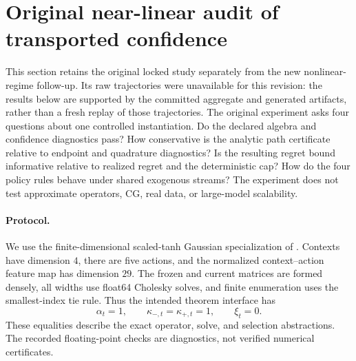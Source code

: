 \section{Original near-linear audit of transported confidence}
\label{sec:transport-instantiation}

This section retains the original locked study separately from the new
nonlinear-regime follow-up.  Its raw trajectories were unavailable for this
revision: the results below are supported by the committed aggregate and
generated artifacts, rather than a fresh replay of those trajectories.
The original experiment asks four questions about one controlled instantiation.  Do the
declared algebra and confidence diagnostics pass?  How conservative is the
analytic path certificate relative to endpoint and quadrature diagnostics?  Is
the resulting regret bound informative relative to realized regret and the
deterministic cap?  How do the four policy rules behave under shared exogenous
streams?  The experiment does not test approximate operators, CG, real data, or
large-model scalability.

\paragraph{Protocol.}
We use the finite-dimensional scaled-tanh Gaussian specialization of
.  Contexts have dimension $4$, there are five
actions, and the normalized context--action feature map has dimension $29$.
The frozen and current matrices are formed densely, all widths use float64
Cholesky solves, and finite enumeration uses the smallest-index tie rule.  Thus
the intended theorem interface has
\[
  \alpha_t=1,\qquad
  \kappa_{-,t}=\kappa_{+,t}=1,\qquad
  \xi_t=0.
\]
These equalities describe the exact operator, solve, and selection abstractions.
The recorded floating-point checks are diagnostics, not verified numerical
certificates.

